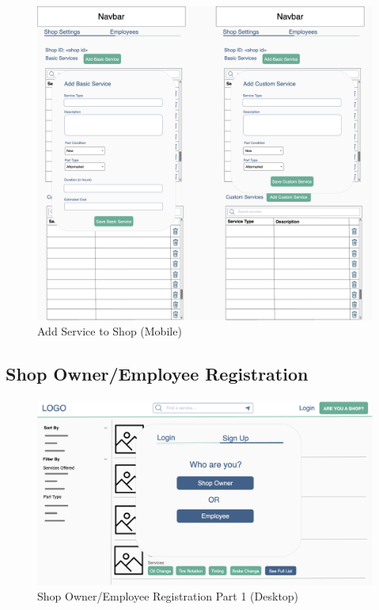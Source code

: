 \documentclass[12pt, titlepage]{article}
\begin{document}
\begin{figure}[H]
	\centering
	\includegraphics[width=\textwidth]{mockups/Service Form (Shop Settings) (Mobile).png}
	\caption{Add Service to Shop (Mobile)}
\end{figure}

\subsection{Shop Owner/Employee Registration}

\begin{figure}[H]
	\centering
	\includegraphics[width=\textwidth]{mockups/Shop Sign Up (Desktop).png}
	\caption{Shop Owner/Employee Registration \textemdash{} Part 1 (Desktop)}
\end{figure}
\end{document}

